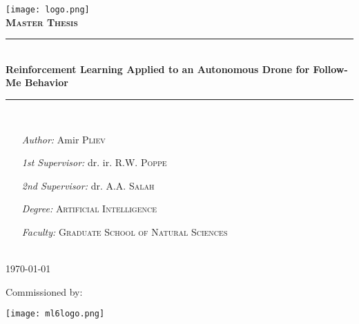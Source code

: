 
\begin{titlepage}

\newcommand{\HRule}{\rule{\linewidth}{0.5mm}} %

\center %
 

\texttt{[image: logo.png]}\\[1cm] %
\textsc{\Large \textbf{Master Thesis}}\\[0.5cm] %


\HRule \\[0.4cm]
{ \huge \bfseries Reinforcement Learning Applied to an Autonomous Drone for Follow-Me Behavior}\\[0.4cm] %
\HRule \\[1.0cm]
 

\begin{minipage}[t]{0.65\textwidth}
	\begin{itemize}
	\item[\emph{Author:}] Amir \textsc{Pliev}
	\item[\emph{1st Supervisor:}] dr. ir. R.W. \textsc{Poppe}
	\item[\emph{2nd Supervisor:}] dr. A.A. \textsc{Salah}
	\item[\emph{Degree:}] \textsc{Artificial Intelligence}
	\item[\emph{Faculty:}]  \textsc{Graduate School of Natural Sciences}
	\end{itemize}
\end{minipage}\\[0.8cm]

{\large \today}\\[1cm]

\begin{center}
	Commissioned by:
\end{center}
\texttt{[image: ml6logo.png]}


\vfill %

\end{titlepage}
